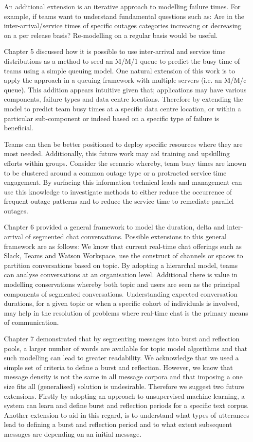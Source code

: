 An additional extension is an iterative approach to modelling failure times. For example, if teams want to understand fundamental questions such as: Are in the inter-arrival/service times of specific outages categories increasing or decreasing on a per release basis? Re-modelling on a regular basis would be useful.

Chapter 5 discussed how it is possible to use inter-arrival and service time distributions as a method to seed an M/M/1 queue to predict the busy time of teams using a simple queuing model. One natural extension of this work is to apply the approach in a queuing framework with multiple servers (i.e. an M/M/c queue). This addition appears intuitive given that; applications may have various components, failure types and data centre locations. Therefore by extending the model to predict team busy times at a specific data centre location, or within a particular sub-component or indeed based on a specific type of failure is beneficial. 

Teams can then be better positioned to deploy specific resources where they are most needed. Additionally, this future work may aid training and upskilling efforts within groups. Consider the scenario whereby, team busy times are known to be clustered around a common outage type or a protracted service time engagement. By surfacing this information technical leads and management can use this knowledge to investigate methods to either reduce the occurrence of frequent outage patterns and to reduce the service time to remediate parallel outages.

Chapter 6 provided a general framework to model the duration, delta and inter-arrival of segmented chat conversations. Possible extensions to this general framework are as follows: We know that current real-time chat offerings such as Slack, Teams and Watson Workspace, use the construct of channels or spaces to partition conversations based on topic. By adopting a hierarchal model, teams can analyse conversations at an organisation level. Additional there is value in modelling conservations whereby both topic and users are seen as the principal components of segmented conversations. Understanding expected conversation durations, for a given topic or when a specific cohort of individuals is involved, may help in the resolution of problems where real-time chat is the primary means of communication.

Chapter 7 demonstrated that by segmenting messages into burst and reflection pools, a larger number of words are available for topic model algorithms and that such modelling can lead to greater readability. We acknowledge that we used a simple set of criteria to define a burst and reflection. However, we know that message density is not the same in all message corpora and that imposing a one size fits all (generalised) solution is undesirable. Therefore we suggest two future extensions. Firstly by adopting an approach to unsupervised machine learning, a system can learn and define burst and reflection periods for a specific text corpus. Another extension to aid in this regard, is to understand what types of utterances lead to defining a burst and reflection period and to what extent subsequent messages are depending on an initial message.

